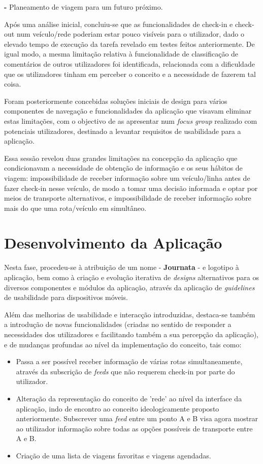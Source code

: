 \documentclass[9pt,a4paper]{extarticle}
\begin{document}
\begin{multicols}{2}
\textbf{-} Planeamento de viagem para um futuro próximo.

Após uma análise inicial, concluiu-se que as funcionalidades de check-in e check-out num veículo/rede poderiam estar pouco visíveis para o utilizador, dado o elevado tempo de execução da tarefa revelado em testes feitos anteriormente. De igual modo, a mesma limitação relativa à funcionalidade de classificação de comentários de outros utilizadores foi identificada, relacionada com a dificuldade que os utilizadores tinham em perceber o conceito e a necessidade de fazerem tal coisa.

Foram posteriormente concebidas soluções iniciais de design para vários componentes de navegação e funcionalidades da aplicação que visavam eliminar estas limitações, com o objectivo de as apresentar num \emph{focus group} realizado com potenciais utilizadores, destinado a levantar requisitos de usabilidade para a aplicação.

Essa sessão revelou duas grandes limitações na concepção da aplicação que condicionavam a necessidade de obtenção de informação e os seus hábitos de viagem: impossibilidade de receber informação sobre um veículo/linha antes de fazer check-in nesse veículo, de modo a tomar uma decisão informada e optar por meios de transporte alternativos, e impossibilidade de receber informação sobre mais do que uma rota/veículo em simultâneo.


\section{Desenvolvimento da Aplicação}

Nesta fase, procedeu-se à atribuição de um nome - \textbf{Journata} - e logotipo à aplicação, bem como à criação e evolução iterativa de \emph{designs} alternativos para os diversos componentes e módulos da aplicação, através da aplicação de \emph{guidelines} de usabilidade para dispositivos móveis. 

Além das melhorias de usabilidade e interacção introduzidas, destaca-se também a introdução de novas funcionalidades (criadas no sentido de responder a necessidades dos utilizadores e facilitando também a sua percepção da aplicação), e de mudanças profundas ao nível da implementação do conceito, tais como:

\begin{itemize}
\item Passa a ser possível receber informação de várias rotas simultaneamente, através da subscrição de \emph{feeds} que não requerem check-in por parte do utilizador.
\item Alteração da representação do conceito de 'rede' ao nível da interface da aplicação, indo de encontro ao conceito ideologicamente proposto anteriormente. Subscrever uma \emph{feed} entre um ponto A e B visa agora mostrar ao utilizador informação sobre todas as opções possíveis de transporte entre A e B.
\item Criação de uma lista de viagens favoritas e viagens agendadas.
\end{itemize}


\end{multicols}
\end{document}
